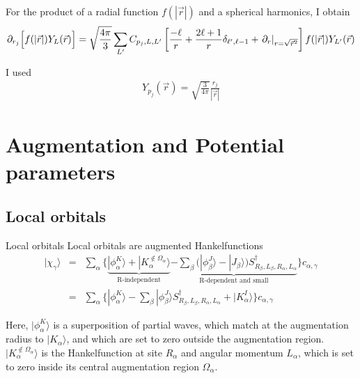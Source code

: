\documentclass[11pt,a4paper]{report}
\begin{document}
For the product of a radial function $f(|\vec{r}|)$ and a spherical 
harmonics, I obtain
\begin{eqnarray}
\partial_{r_j}\Bigl[f(|\vec{r}|) Y_L(\vec{r})\Bigr]
=\sqrt{\frac{4\pi}{3}}\sum_{L'}
C_{p_j,L,L'}
\left[
\frac{-\ell}{r}+\frac{2\ell+1}{r}\delta_{\ell',\ell-1}
+\left.\partial_r\right|_{r=\sqrt{\vec{r}^2}} 
\right]
f(|\vec{r}|)Y_{L'}(\vec{r})
\end{eqnarray}

I used
\begin{eqnarray}
  Y_{p_j}(\vec{r})=\sqrt{\frac{3}{4\pi}}\frac{r_j}{|\vec{r}|}
\end{eqnarray}

\section{Augmentation and Potential parameters}
\subsection{Local orbitals}
\begin{myshadowminipage}{Local orbitals}
Local orbitals are augmented Hankelfunctions
\begin{eqnarray}
|\chi_\gamma\rangle&=&
\sum_\alpha \biggl\lbrace
\underbrace{
|\phi^{K}_{\alpha}\rangle+ |K^{\notin\Omega_\alpha}_\alpha\rangle
}_{\text{R-independent}}
\underbrace{
-\sum_{\beta}
\biggl(|\phi^J_{\beta}\rangle -|J_{\beta}\rangle\biggr)
S^\dagger_{R_\beta,L_\beta,R_\alpha,L_\alpha}}_{\text{R-dependent and small}}
\biggr\rbrace c_{\alpha,\gamma}
\nonumber\\
&=&\sum_\alpha \biggl\lbrace
|\phi^{K}_{\alpha}\rangle
-\sum_{\beta}
|\phi^J_{\beta}\rangle S^\dagger_{R_\beta,L_\beta,R_\alpha,L_\alpha}
+ |K^{I}_\alpha\rangle
\biggr\rbrace c_{\alpha,\gamma}
\end{eqnarray}
\end{myshadowminipage}
Here, $|\phi^K_\alpha\rangle$ is a superposition of partial waves,
which match at the augmentation radius to $|K_\alpha\rangle$, and
which are set to zero outside the augmentation region.
$|K^{\notin\Omega_\alpha}_\alpha\rangle$ is the Hankelfunction at site
$R_\alpha$ and angular momentum $L_\alpha$, which is set to zero
inside its central augmentation region $\Omega_\alpha$.
\end{document}
